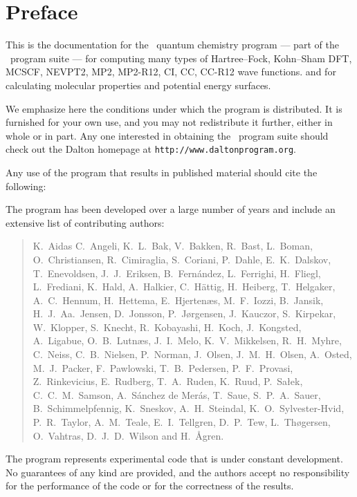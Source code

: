 \tableofcontents

\chapter*{Preface}

This is the documentation for the \dalton\ quantum chemistry program
--- part of the \latestrelease\ program suite ---
for computing many types of Hartree--Fock, Kohn--Sham DFT, 
MCSCF, NEVPT2, MP2, MP2-R12, CI, CC, CC-R12 wave functions.
and for calculating molecular properties and potential energy surfaces.

          We emphasize here the conditions under which the
program is distributed.  It is furnished for your own use,
and you may not redistribute it further, either in whole or in
part.  Any one interested in obtaining the \latestrelease\ program suite
should check out the Dalton homepage at \verb|http://www.daltonprogram.org|.

Any use of the program that results in published
material should cite the following:
\begin{quote}
\nocite{dalton}
\end{quote}

The program has been developed over a large number of years and
include an extensive list of contributing authors:

\begin{quote}\raggedright
K.~Aidas
C.~Angeli,
K.~L.~Bak,
V.~Bakken,
R.~Bast,
L.~Boman,
O.~Christiansen,
R.~Cimiraglia,
S.~Coriani,
P.~Dahle,
E.~K.~Dalskov,
T.~Enevoldsen,
J.~J.~Eriksen,
B.~Fern\'{a}ndez,
L.~Ferrighi,
H.~Fliegl,
L.~Frediani,
K.~Hald,
A.~Halkier,
C.~H{\"a}ttig,
H.~Heiberg,
T.~Helgaker,
A.~C.~Hennum,
H.~Hettema,
E.~Hjerten\ae{}s,
M.~F.~Iozzi,
B.~Jansik,
H.~J.~Aa.~Jensen,
D.~Jonsson,
P.~J{\o}rgensen,
J.~Kauczor,
S.~Kirpekar,
W.~Klopper,
S.~Knecht,
R.~Kobayashi,
H.~Koch,
J.~Kongsted,
A.~Ligabue,
O.~B.~Lutn\ae{}s,
J.~I.~Melo,
K.~V.~Mikkelsen,
R.~H.~Myhre,
C.~Neiss,
C.~B.~Nielsen,
P.~Norman,
J.~Olsen,
J.~M.~H.~Olsen,
A.~Osted,
M.~J.~Packer,
F.~Pawlowski,
T.~B.~Pedersen,
P.~F.~Provasi,
Z.~Rinkevicius,
E.~Rudberg,
T.~A.~Ruden,
K.~Ruud,
P.~Sa\l{}ek,
C.~C.~M.~Samson,
A.~S\'{a}nchez de Mer\'{a}s,
T.~Saue,
S.~P.~A.~Sauer,
B.~Schimmelpfennig,
K.~Sneskov,
A.~H.~Steindal,
K.~O.~Sylvester-Hvid,
P.~R.~Taylor,
A.~M.~Teale,
E.~I.~Tellgren,
D.~P.~Tew,
L.~Th\o{}gersen,
O.~Vahtras,
D.~J.~D.~Wilson
and H.~{\AA}gren.
\end{quote}

          The program represents experimental code that is
under constant development.  No guarantees of any kind are
provided, and the authors accept no responsibility for the
performance of the code or for the correctness of the results.
